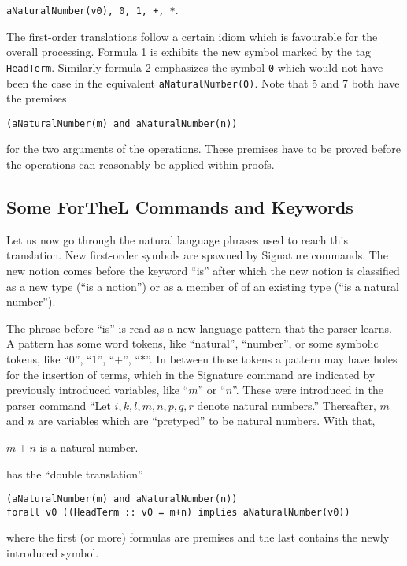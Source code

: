 \documentclass[11pt]{article}
\begin{document}
\verb_aNaturalNumber(v0), 0, 1, +, *_.

The first-order translations follow a certain idiom which
is favourable for the overall processing. Formula 1 is
exhibits
the new symbol marked by the tag \verb+HeadTerm+. Similarly
formula 2 emphasizes the symbol \verb+0+ which would not have been
the case in the equivalent \verb+aNaturalNumber(0)+.
Note that 5 and 7 both have the premises

\verb+(aNaturalNumber(m) and aNaturalNumber(n))+

\noindent for the two arguments of the operations. These premises have to
be proved before the operations can reasonably be applied within
proofs.

\subsection{Some ForTheL Commands and Keywords}

Let us now go through the natural language phrases used to
reach this translation. New first-order symbols are spawned by
Signature commands. The new notion comes before the keyword ``is''
after which the new notion is classified as a new type (``is a notion'')
or as a member of of an existing type (``is a natural number'').

The phrase before ``is'' is read as a new language pattern that
the parser learns. A pattern has some word tokens,
like ``natural'',
``number'', or some symbolic tokens, like
``$0$'', ``$1$'', ``$+$'', ``$*$''.
In between those tokens a pattern may have holes for the insertion
of terms, which in the Signature command are indicated by previously
introduced variables, like ``$m$'' or ``$n$''. These were introduced in
the parser command ``Let $i,k,l,m,n,p,q,r$ denote natural numbers.''
Thereafter, $m$ and $n$ are variables which are ``pretyped'' to be
natural numbers. With that,
\begin{signature} $m + n$ is a natural number.
\end{signature}
has the ``double translation''
\begin{verbatim}
(aNaturalNumber(m) and aNaturalNumber(n))
forall v0 ((HeadTerm :: v0 = m+n) implies aNaturalNumber(v0))
\end{verbatim}
where the first (or more) formulas are premises and the last contains the
newly introduced symbol.
\end{document}
